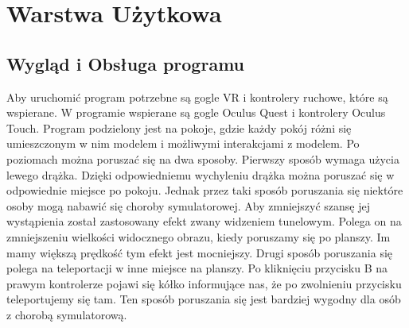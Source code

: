 \documentclass[a4paper,12pt,reqno]{article}
\begin{document}
\newpage
\section{Warstwa Użytkowa}

\subsection{Wygląd i Obsługa programu}

Aby uruchomić program potrzebne są gogle VR i kontrolery ruchowe, które są wspierane. W programie wspierane są gogle Oculus Quest i kontrolery Oculus Touch. Program podzielony jest na pokoje, gdzie każdy pokój różni się umieszczonym w nim modelem i możliwymi interakcjami z modelem. Po poziomach można poruszać się na dwa sposoby. Pierwszy sposób wymaga użycia lewego drążka. Dzięki odpowiedniemu wychyleniu drążka można poruszać się w odpowiednie miejsce po pokoju. Jednak przez taki sposób poruszania się niektóre osoby mogą nabawić się choroby symulatorowej\cite{choroba_vr}. Aby zmniejszyć szansę jej wystąpienia został zastosowany efekt zwany widzeniem tunelowym. Polega on na zmniejszeniu wielkości widocznego obrazu, kiedy poruszamy się po planszy. Im mamy większą prędkość tym efekt jest mocniejszy. Drugi sposób poruszania się polega na teleportacji w inne miejsce na planszy. Po kliknięciu przycisku B na prawym kontrolerze pojawi się kółko informujące nas, że po zwolnieniu przycisku teleportujemy się tam. Ten sposób poruszania się jest bardziej wygodny dla osób z chorobą symulatorową.
\end{document}

